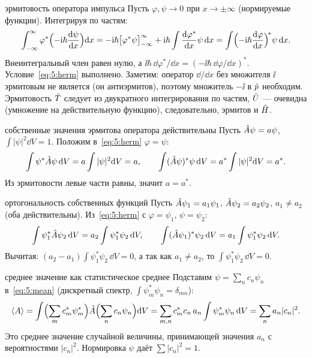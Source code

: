\begin{derivation}[label=der:5:pherm]{эрмитовость оператора импульса}
Пусть $\varphi,\psi\to0$ при $x\to\pm\infty$ (нормируемые функции). Интегрируя по частям:
\[
  \int_{-\infty}^{\infty}\varphi^*\Bigl(-\mathrm{i}\hbar\frac{\mathrm{d} \psi}{\mathrm{d} x}\Bigr)\mathrm{d} x
  =-\mathrm{i}\hbar\bigl[\varphi^*\psi\bigr]_{-\infty}^{\infty}+\mathrm{i}\hbar\int\frac{\mathrm{d} \varphi^*}{\mathrm{d} x}\psi\,\mathrm{d} x
  =\int\Bigl(-\mathrm{i}\hbar\frac{\mathrm{d} \varphi}{\mathrm{d} x}\Bigr)^{\!*}\psi\,\mathrm{d} x .
\]
Внеинтегральный член равен нулю, а $\ii\hbar\,\dd\varphi^*/\dd x=(-\ii\hbar\,\dd\varphi/\dd x)^*$.
Условие~\eqref{eq:5:herm} выполнено. Заметим: оператор $\dd/\dd x$ без множителя $\ii$ эрмитовым
не является (он антиэрмитов), поэтому множитель $-\ii$ в $\hat{p}$ необходим. Эрмитовость $\hat{T}$
следует из двукратного интегрирования по частям, $\hat{U}$ — очевидна (умножение на
действительную функцию), следовательно, эрмитов и $\hat{H}$.
\end{derivation}

\begin{derivation}[label=der:5:real]{собственные значения эрмитова оператора действительны}
Пусть $\hat{A}\psi=a\psi$, $\int|\psi|^2\dd V=1$. Положим в~\eqref{eq:5:herm} $\varphi=\psi$:
\[
  \int\psi^*\hat{A}\psi\,\mathrm{d} V=a\int|\psi|^2\mathrm{d} V=a,\qquad
  \int(\hat{A}\psi)^*\psi\,\mathrm{d} V=a^*\int|\psi|^2\mathrm{d} V=a^* .
\]
Из эрмитовости левые части равны, значит $a=a^*$.
\end{derivation}

\begin{derivation}[label=der:5:orth]{ортогональность собственных функций}
Пусть $\hat{A}\psi_1=a_1\psi_1$, $\hat{A}\psi_2=a_2\psi_2$, $a_1\neq a_2$ (оба действительны).
Из~\eqref{eq:5:herm} с $\varphi=\psi_1$, $\psi=\psi_2$:
\[
  \int\psi_1^*\hat{A}\psi_2\,\mathrm{d} V=a_2\int\psi_1^*\psi_2\,\mathrm{d} V,\qquad
  \int(\hat{A}\psi_1)^*\psi_2\,\mathrm{d} V=a_1\int\psi_1^*\psi_2\,\mathrm{d} V .
\]
Вычитая: $(a_2-a_1)\int\psi_1^*\psi_2\,\dd V=0$, а так как $a_1\neq a_2$, то $\int\psi_1^*\psi_2\,\dd V=0$.
\end{derivation}

\begin{derivation}[label=der:5:avg]{среднее значение как статистическое среднее}
Подставим $\psi=\sum_nc_n\psi_n$ в~\eqref{eq:5:mean} (дискретный спектр, $\int\psi_m^*\psi_n=\delta_{mn}$):
\[
  \langle A\rangle=\int\Bigl(\sum_mc_m^*\psi_m^*\Bigr)\hat{A}\Bigl(\sum_nc_n\psi_n\Bigr)\mathrm{d} V
  =\sum_{m,n}c_m^*c_n\,a_n\int\psi_m^*\psi_n\,\mathrm{d} V=\sum_n a_n|c_n|^2 .
\]
Это среднее значение случайной величины, принимающей значения $a_n$ с вероятностями $|c_n|^2$.
Нормировка $\psi$ даёт $\sum|c_n|^2=1$.
\end{derivation}


